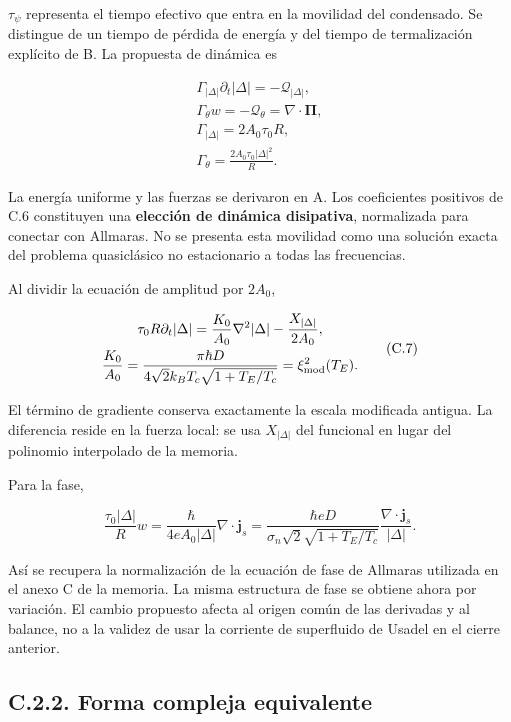 \documentclass[
  spanish,
  10pt,
  a4paper,
]{article}
\begin{document}
\(\tau_\psi\) representa el tiempo efectivo que entra en la movilidad
del condensado. Se distingue de un tiempo de pérdida de energía y del
tiempo de termalización explícito de B. La propuesta de dinámica es

\[
\begin{gathered}
\Gamma_{|\Delta|}\partial_t|\Delta|=-\mathcal Q_{|\Delta|},\\
\Gamma_\theta w=-\mathcal Q_\theta=\nabla\cdot\boldsymbol\Pi,\\
\Gamma_{|\Delta|}=2A_0\tau_0R,\\
\Gamma_\theta=\frac{2A_0\tau_0|\Delta|^2}{R}.
\end{gathered} \tag{C.6}
\]

La energía uniforme y las fuerzas se derivaron en A. Los coeficientes
positivos de C.6 constituyen una \textbf{elección de dinámica
disipativa}, normalizada para conectar con Allmaras. No se presenta esta
movilidad como una solución exacta del problema quasiclásico no
estacionario a todas las frecuencias.

Al dividir la ecuación de amplitud por \(2A_0\),

\[
\begin{gathered}
\tau_0R\partial_t|\Delta|=\frac{K_0}{A_0}\nabla^2|\Delta|-\frac{X_{|\Delta|}}{2A_0},\\
\frac{K_0}{A_0}
=\frac{\pi\hbar D}{4\sqrt2 k_BT_c\sqrt{1+T_E/T_c}}
=\xi_{\rm mod}^2(T_E).
\end{gathered} \tag{C.7}
\]

El término de gradiente conserva exactamente la escala modificada
antigua. La diferencia reside en la fuerza local: se usa
\(X_{|\Delta|}\) del funcional en lugar del polinomio interpolado de la
memoria.

Para la fase,

\[
\frac{\tau_0|\Delta|}{R}w=\frac\hbar{4eA_0|\Delta|}\nabla\cdot\mathbf j_s
=\frac{\hbar eD}{\sigma_n\sqrt2\sqrt{1+T_E/T_c}}
\frac{\nabla\cdot\mathbf j_s}{|\Delta|}. \tag{C.8}
\]

Así se recupera la normalización de la ecuación de fase de Allmaras
utilizada en el anexo C de la memoria. La misma estructura de fase se
obtiene ahora por variación. El cambio propuesto afecta al origen común
de las derivadas y al balance, no a la validez de usar la corriente de
superfluido de Usadel en el cierre anterior.

\subsection{C.2.2. Forma compleja
equivalente}\label{c.2.2.-forma-compleja-equivalente}
\end{document}
